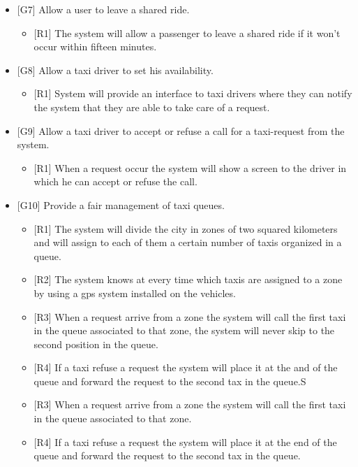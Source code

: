 \begin{itemize}
\begin{itemize}
			\end{itemize}
		\item {[G7]} Allow a user to leave a shared ride.
			\begin{itemize}
				\item {[R1]} The system will allow a passenger to leave a shared ride if it won't occur within fifteen minutes.
			\end{itemize}
		\item {[G8]} Allow a taxi driver to set his availability.
			\begin{itemize}
				\item {[R1]} System will provide an interface to taxi drivers where they can notify the system that they are able to take care of a request.
			\end{itemize}
		\item {[G9]} Allow a taxi driver to accept or refuse a call for a taxi-request from the system.
			\begin{itemize}
				\item {[R1]} When a request occur the system will show a screen to the driver in which he can accept or refuse the call.
			\end{itemize}
		\item {[G10]} Provide a fair management of taxi queues.
			\begin{itemize}
				\item {[R1]} The system will divide the city in zones of two squared kilometers and will assign to each of them a certain number of taxis organized in a queue.
				\item {[R2]} The system knows at every time which taxis are assigned to a zone by using a gps system installed on the vehicles.
				\item {[R3]} When a request arrive from a zone the system will call the first taxi in the queue associated to that zone, the system will never skip to the second position in the queue.
				\item {[R4]} If a taxi refuse a request the system will place it at the and of the queue and forward the request to the second tax in the queue.S
				\item {[R3]} When a request arrive from a zone the system will call the first taxi in the queue associated to that zone.
				\item {[R4]} If a taxi refuse a request the system will place it at the end of the queue and forward the request to the second tax in the queue.

			\end{itemize}
		\end{itemize}
\newpage
